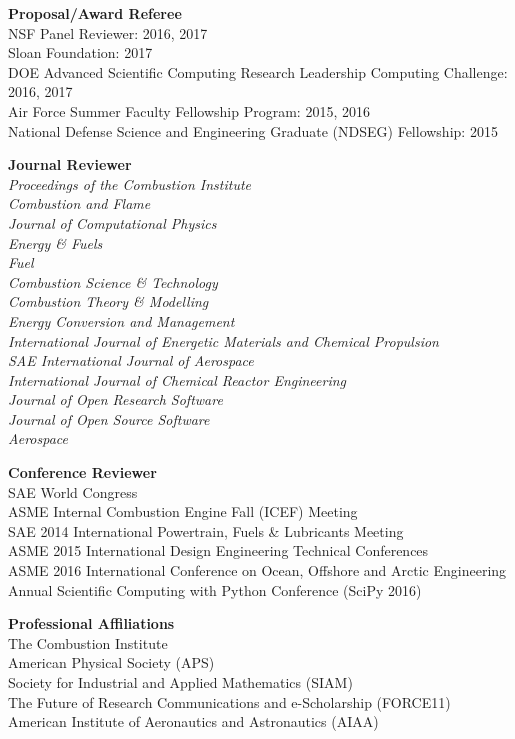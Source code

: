 \documentclass[margin,line,11pt]{res}
\begin{document}
\begin{resume}
\textbf{Proposal\slash Award Referee} \\
NSF Panel Reviewer: 2016, 2017 \\
Sloan Foundation: 2017 \\
DOE Advanced Scientific Computing Research Leadership Computing Challenge: 2016, 2017 \\
Air Force Summer Faculty Fellowship Program: 2015, 2016 \\
National Defense Science and Engineering Graduate (NDSEG) Fellowship: 2015

\textbf{Journal Reviewer} \\
\emph{Proceedings of the Combustion Institute}\\
\emph{Combustion and Flame}\\
\emph{Journal of Computational Physics}\\
\emph{Energy \& Fuels}\\
\emph{Fuel}\\
\emph{Combustion Science \& Technology}\\
\emph{Combustion Theory \& Modelling}\\
\emph{Energy Conversion and Management}\\
\emph{International Journal of Energetic Materials and Chemical Propulsion}\\
\emph{SAE International Journal of Aerospace}\\
\emph{International Journal of Chemical Reactor Engineering} \\
\emph{Journal of Open Research Software} \\
\emph{Journal of Open Source Software} \\
\emph{Aerospace}

\textbf{Conference Reviewer} \\
SAE World Congress\\
ASME Internal Combustion Engine Fall (ICEF) Meeting\\
SAE 2014 International Powertrain, Fuels \& Lubricants Meeting \\
ASME 2015 International Design Engineering Technical Conferences \\
ASME 2016  International Conference on Ocean, Offshore and Arctic Engineering \\
 Annual Scientific Computing with Python Conference (SciPy 2016)

\textbf{Professional Affiliations} \\
The Combustion Institute \\
American Physical Society (APS) \\
Society for Industrial and Applied Mathematics (SIAM) \\
The Future of Research Communications and e-Scholarship (FORCE11) \\
American Institute of Aeronautics and Astronautics (AIAA)


\end{resume}
\end{document}
